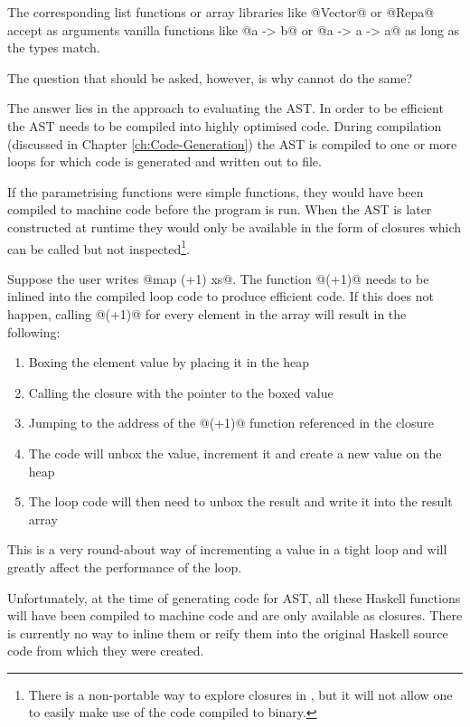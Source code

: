 \documentclass[preamble.tex]{subfiles}
\begin{document}
The corresponding \Haskell list functions or array libraries like @Vector@ or @Repa@ \cite{KCL+10} accept as arguments vanilla \Haskell functions like @a -> b@ or @a -> a -> a@ as long as the types match.

The question that should be asked, however, is why cannot \LiveFusion do the same?

The answer lies in the approach to evaluating the AST. In order to be efficient the AST needs to be compiled into highly optimised code. During compilation (discussed in Chapter \ref{ch:Code-Generation}) the AST is compiled to one or more loops for which \Haskell code is generated and written out to file.

If the parametrising functions were simple \Haskell functions, they would have been compiled to machine code before the program is run. When the AST is later constructed at runtime they would only be available in the form of closures which can be called but not inspected\footnote{There is a non-portable way to explore closures in \Haskell, but it will not allow one to easily make use of the code compiled to binary.}.

Suppose the user writes @map (+1) xs@. The function @(+1)@ needs to be inlined into the compiled loop code to produce efficient code. If this does not happen, calling @(+1)@ for every element in the array will result in the following:

\begin{enumerate}
\item Boxing the element value by placing it in the heap
\item Calling the closure with the pointer to the boxed value
\item Jumping to the address of the @(+1)@ function referenced in the closure
\item The code will unbox the value, increment it and create a new value on the heap
\item The loop code will then need to unbox the result and write it into the result array
\end{enumerate}

This is a very round-about way of incrementing a value in a tight loop and will greatly affect the performance of the loop.

Unfortunately, at the time of generating code for AST, all these Haskell functions will have been compiled to machine code and are only available as closures. There is currently no way to inline them or reify them into the original Haskell source code from which they were created.
\end{document}
